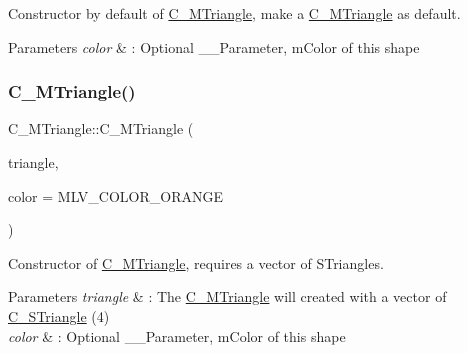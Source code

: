 Constructor by default of \hyperlink{classC__MTriangle}{C\+\_\+\+M\+Triangle}, make a \hyperlink{classC__MTriangle}{C\+\_\+\+M\+Triangle} as default. 


\begin{DoxyParams}{Parameters}
{\em color} & \+: Optional \+\_\+\+\_\+\+Parameter, m\+Color of this shape \\
\hline
\end{DoxyParams}
\mbox{\label{classC__MTriangle_a1a628c318d5b8982d5efa904e105ce10}} 
\subsubsection{\texorpdfstring{C\+\_\+\+M\+Triangle()}{C\_MTriangle()}\hspace{0.1cm}{\footnotesize\ttfamily [2/3]}}
{\footnotesize\ttfamily C\+\_\+\+M\+Triangle\+::\+C\+\_\+\+M\+Triangle (\begin{DoxyParamCaption}\item[{const std\+::vector$<$ \hyperlink{classC__STriangle}{C\+\_\+\+S\+Triangle} $>$ \&}]{triangle,  }\item[{M\+L\+V\+\_\+\+Color}]{color = {\ttfamily MLV\+\_\+COLOR\+\_\+ORANGE} }\end{DoxyParamCaption})\hspace{0.3cm}{\ttfamily [explicit]}}



Constructor of \hyperlink{classC__MTriangle}{C\+\_\+\+M\+Triangle}, requires a vector of S\+Triangles. 


\begin{DoxyParams}{Parameters}
{\em triangle} & \+: The \hyperlink{classC__MTriangle}{C\+\_\+\+M\+Triangle} will created with a vector of \hyperlink{classC__STriangle}{C\+\_\+\+S\+Triangle} (4) \\
\hline
{\em color} & \+: Optional \+\_\+\+\_\+\+Parameter, m\+Color of this shape \\
\hline
\end{DoxyParams}
\mbox{\label{classC__MTriangle_a5a8ffada7ee743f463304b1093394404}} 
